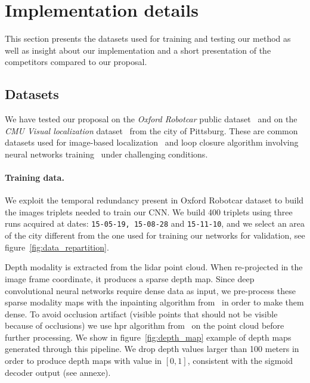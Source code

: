 \section{Implementation details}
\label{sec:impl_details}

This section presents the datasets used for training and testing our method as well as insight about our implementation and a short presentation of the competitors compared to our proposal.

\subsection{Datasets}
\label{subsec:dataset}
	We have tested our proposal on the \textit{Oxford Robotcar} public dataset~\cite{Maddern2016} and on the \textit{CMU Visual localization} dataset~\cite{Bansal2014a} from the city of Pittsburg. These are common datasets used for image-based localization~\cite{Sattler2018} and loop closure algorithm involving neural networks training~\cite{Porav2018} under challenging conditions.
		
\paragraph{Training data.}

We exploit the temporal redundancy present in Oxford Robotcar dataset to build the images triplets needed to train our CNN. We build 400 triplets using three runs acquired at dates: \texttt{15-05-19, 15-08-28} and \texttt{15-11-10}, and we select an area of the city different from the one used for training our networks for validation, see figure~\ref{fig:data_repartition}.


Depth modality is extracted from the lidar point cloud. When re-projected in the image frame coordinate, it produces a sparse depth map. Since deep convolutional neural networks require dense data as input, we pre-process these sparse modality maps with the inpainting algorithm from~\cite{Bevilacqua2017} in order to make them dense. To avoid occlusion artifact (visible points that should not be visible because of occlusions) we use \ac{hpr} algorithm from~\citet{Katz2007} on the point cloud before further processing. We show in figure~\ref{fig:depth_map} example of depth maps generated through this pipeline. We drop depth values larger than 100 meters in order to produce depth maps with value in $[0, 1]$, consistent with the sigmoid decoder output (see annexe).

